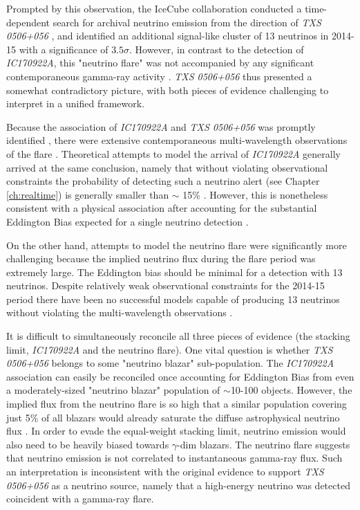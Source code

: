 Prompted by this observation, the IceCube collaboration conducted a time-dependent search for archival neutrino emission from the direction of \emph{TXS 0506+056} , and identified an additional signal-like cluster of 13 neutrinos in 2014-15 with a significance of $3.5 \sigma$. However, in contrast to the detection of \emph{IC170922A}, this "neutrino flare" was not accompanied by any significant contemporaneous gamma-ray activity . \emph{TXS 0506+056} thus presented a somewhat contradictory picture, with both pieces of evidence challenging to interpret in a unified framework. 

Because the association of \emph{IC170922A} and \emph{TXS 0506+056} was promptly identified , there were extensive contemporaneous multi-wavelength observations of the flare \cite{2018Sci...361.1378I}. Theoretical attempts to model the arrival of \emph{IC170922A} generally arrived at the same conclusion, namely that without violating observational constraints the probability of detecting such a neutrino alert (see Chapter \ref{ch:realtime}) is generally smaller than $\sim$ 15\% . However, this is nonetheless consistent with a physical association after accounting for the substantial Eddington Bias expected for a single neutrino detection .

On the other hand, attempts to model the neutrino flare were significantly more challenging because the implied neutrino flux during the flare period was extremely large. The Eddington bias should be minimal for a detection with 13 neutrinos. Despite relatively weak observational constraints for the 2014-15 period there have been no successful models capable of producing 13 neutrinos without violating the multi-wavelength observations .

It is difficult to simultaneously reconcile all three pieces of evidence (the stacking limit, \emph{IC170922A} and the neutrino flare). One vital question is whether \emph{TXS 0506+056} belongs to some "neutrino blazar" sub-population. The \emph{IC170922A} association can easily be reconciled once accounting for Eddington Bias from even a moderately-sized "neutrino blazar" population of $\sim$10-100 objects. However, the implied flux from the neutrino flare is so high that a similar population covering just 5\% of all blazars would already saturate the diffuse astrophysical neutrino flux . In order to evade the equal-weight stacking limit, neutrino emission would also need to be heavily biased towards $\gamma$-dim blazars. The neutrino flare suggests that neutrino emission is not correlated to instantaneous gamma-ray flux. Such an interpretation is inconsistent with the original evidence to support \emph{TXS 0506+056} as a neutrino source, namely that a high-energy neutrino was detected coincident with a gamma-ray flare.

